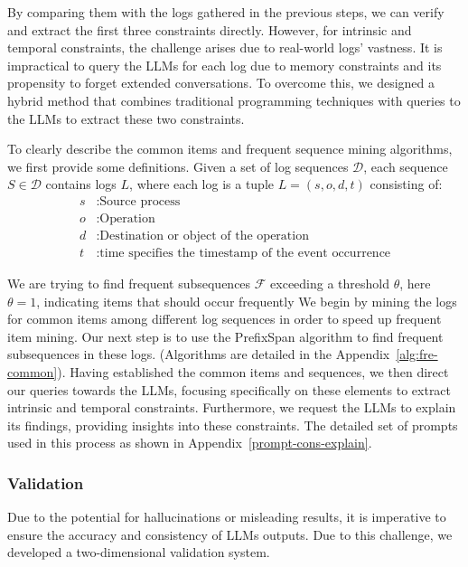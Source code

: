 By comparing them with the logs gathered in the previous steps, we can verify and extract the first three constraints directly.
However, for intrinsic and temporal constraints, the challenge arises due to real-world logs' vastness. It is impractical to query the LLMs for each log due to memory constraints and its propensity to forget extended conversations. To overcome this, we designed a hybrid method that combines traditional programming techniques with queries to the LLMs to extract these two constraints.

To clearly describe the common items and frequent sequence mining algorithms, we first provide some definitions.
Given a set of log sequences \( \mathcal{D} \), each sequence \( S \in \mathcal{D} \) contains logs \( L \), where each log is a tuple \( L = (s, o, d,t) \) consisting of:
\begin{align*}
    s & : \text{Source process} \\
    o & : \text{Operation} \\
    d & : \text{Destination or object of the operation}\\
    t & : \text{time specifies the timestamp of the event occurrence}
\end{align*}

We are trying to find frequent subsequences \( \mathcal{F} \) exceeding a threshold \( \theta \), here \( \theta =1\), indicating items that should occur frequently
We begin by mining the logs for common items among different log sequences in order to speed up frequent item mining. Our next step is to use the PrefixSpan algorithm to find frequent subsequences in these logs.
(Algorithms are detailed in the Appendix~\ref{alg:fre-common}).
Having established the common items and sequences, we then direct our queries towards the LLMs, focusing specifically on these elements to extract intrinsic and temporal constraints. Furthermore, we request the LLMs to explain its findings, providing insights into these constraints.
The detailed set of prompts used in this process as shown in Appendix~\ref{prompt-cons-explain}.



\subsubsection{Validation}
Due to the potential for hallucinations or misleading results, it is imperative to ensure the accuracy and consistency of LLMs outputs. Due to this challenge, we developed a two-dimensional validation system.

